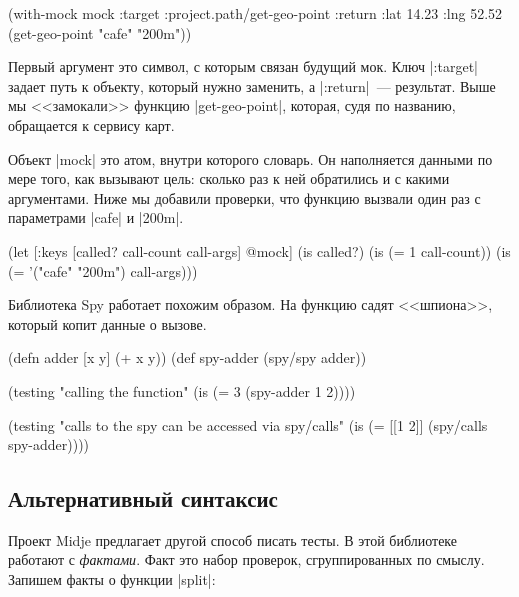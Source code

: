 \begin{english}
  \begin{clojure}
(with-mock mock
  {:target :project.path/get-geo-point
   :return {:lat 14.23 :lng 52.52}}
  (get-geo-point "cafe" "200m"))
  \end{clojure}
\end{english}

Первый аргумент это символ, с которым связан будущий мок. Ключ \spverb|:target|
задает путь к объекту, который нужно заменить, а \spverb|:return|~---
результат. Выше мы <<замокали>> функцию \spverb|get-geo-point|, которая, судя по
названию, обращается к сервису карт.

Объект \spverb|mock| это атом, внутри которого словарь. Он наполняется данными
по мере того, как вызывают цель: сколько раз к ней обратились и с какими
аргументами. Ниже мы добавили проверки, что функцию вызвали один раз с
параметрами \spverb|cafe| и \spverb|200m|.

\begin{english}
  \begin{clojure}
(let [{:keys [called? call-count call-args]} @mock]
  (is called?)
  (is (= 1 call-count))
  (is (= '("cafe" "200m") call-args)))
  \end{clojure}
\end{english}

Библиотека Spy работает
похожим образом. На функцию садят <<шпиона>>, который копит данные о вызове.

\begin{english}
  \begin{clojure}
(defn adder [x y] (+ x y))
(def spy-adder (spy/spy adder))

(testing "calling the function"
  (is (= 3 (spy-adder 1 2))))

(testing "calls to the spy can be accessed via spy/calls"
  (is (= [[1 2]] (spy/calls spy-adder))))
  \end{clojure}
\end{english}

\subsection{Альтернативный синтаксис}

Проект Midje предлагает другой способ
писать тесты. В этой библиотеке работают с \emph{фактами}. Факт это набор
проверок, сгруппированных по смыслу. Запишем факты о функции \spverb|split|:

